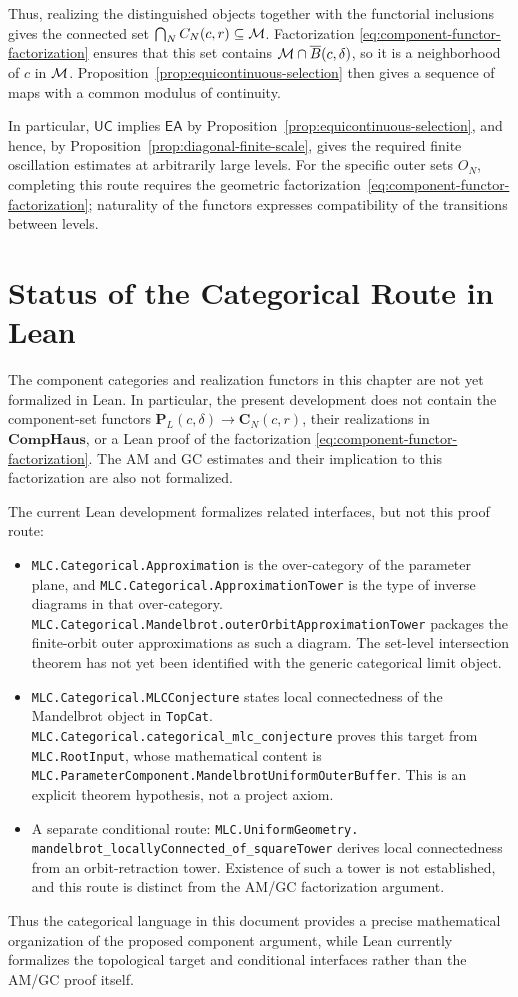 Thus, realizing the distinguished objects together with the functorial
inclusions gives the connected set
\(\bigcap_N C_N(c,r)\subseteq\mathcal M\). Factorization
\eqref{eq:component-functor-factorization} ensures that this set
contains \(\mathcal M\cap\overline B(c,\delta)\), so it is a neighborhood of
\(c\) in \(\mathcal M\). Proposition~\ref{prop:equicontinuous-selection} then
gives a sequence of maps with a common modulus of continuity.

In particular, \(\mathsf{UC}\) implies \(\mathsf{EA}\) by
Proposition~\ref{prop:equicontinuous-selection}, and hence, by
Proposition~\ref{prop:diagonal-finite-scale}, gives the required finite
oscillation estimates at arbitrarily large levels. For the specific
outer sets \(O_N\), completing this route requires the geometric
factorization~\eqref{eq:component-functor-factorization}; naturality of
the functors expresses compatibility of the transitions between levels.

\section{Status of the Categorical Route in Lean}

The component categories and realization functors in this chapter are
not yet formalized in Lean. In particular, the present development does
not contain the component-set functors
\(\mathbf P_L(c,\delta)\to\mathbf C_N(c,r)\), their realizations in
\(\mathbf{CompHaus}\), or a Lean proof of the factorization
\eqref{eq:component-functor-factorization}. The AM and GC estimates and
their implication to this factorization are also not formalized.

The current Lean development formalizes related interfaces, but not
this proof route:
\begin{itemize}
  \item \texttt{MLC.Categorical.Approximation} is the over-category of
  the parameter plane, and \texttt{MLC.Categorical.ApproximationTower}
  is the type of inverse diagrams in that over-category.
  \texttt{MLC.Categorical.Mandelbrot.outerOrbitApproximationTower}
  packages the finite-orbit outer approximations as such a diagram.
  The set-level intersection theorem has not yet been identified with
  the generic categorical limit object.
  \item \texttt{MLC.Categorical.MLCConjecture} states local
  connectedness of the Mandelbrot object in \texttt{TopCat}.
  \texttt{MLC.Categorical.categorical\_mlc\_conjecture} proves this
  target from \texttt{MLC.RootInput}, whose mathematical content is
  \texttt{MLC.ParameterComponent.\allowbreak MandelbrotUniformOuterBuffer}. This
  is an explicit theorem hypothesis, not a project axiom.
  \item A separate conditional route:
  \texttt{MLC.UniformGeometry.}\\
  \texttt{mandelbrot\_locallyConnected\_of\_squareTower}
  derives local connectedness from an orbit-retraction tower. Existence
  of such a tower is not established, and this route is distinct from
  the AM/GC factorization argument.
\end{itemize}

Thus the categorical language in this document provides a precise
mathematical organization of the proposed component argument, while
Lean currently formalizes the topological target and conditional
interfaces rather than the AM/GC proof itself.
